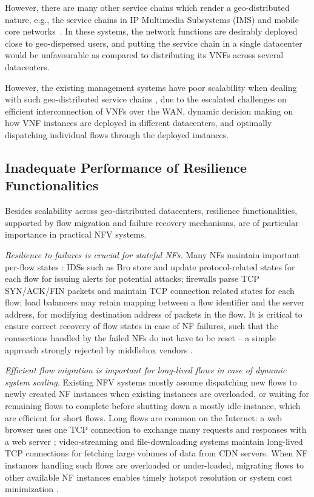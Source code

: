 However, there are many other service chains which render a geo-distributed nature, e.g., the service chains in IP Multimedia Subsystems (IMS) \cite{3gpp-ims} and mobile core networks~\cite{epc}. In these systems, the network functions are desirably deployed close to geo-dispersed users, and putting the service chain in a single datacenter would be unfavourable as compared to distributing its VNFs across several datacenters.

However, the existing management systems have poor scalability when dealing with such geo-distributed service chains \cite{qazi2016klein}, due to the escalated challenges on efficient interconnection of VNFs over the WAN, dynamic decision making on how VNF instances are deployed in different datacenters, and optimally dispatching individual flows through the deployed instances.

\subsection{Inadequate Performance of Resilience Functionalities}

Besides scalability across geo-distributed datacenters, resilience functionalities, supported by flow migration and failure recovery mechanisms, are of particular importance in practical NFV systems.

{\em Resilience to failures \cite{sherry2015rollback,rajagopalan2013pico} is crucial for stateful NFs.}  Many NFs maintain important per-flow states \cite{EnablingNF}: IDSs such as Bro \cite{bro} store and update protocol-related states for each flow for issuing alerts for potential attacks; firewalls \cite{firewall} parse TCP SYN/ACK/FIN packets and maintain TCP connection related states for each flow; load balancers \cite{lvs} may retain mapping between a flow identifier and the server address, for modifying destination address of packets in the flow. It is critical to ensure correct recovery of flow states in case of NF failures, such that the connections handled by the failed NFs do not have to be reset -- a simple approach strongly rejected by middlebox vendors \cite{sherry2015rollback}.

{\em Efficient flow migration \cite{rajagopalan2013split, gember2015opennf, qazi2017high} is important for long-lived flows in case of dynamic system scaling.} Existing NFV systems \cite{palkar2015e2, gember2012stratos} mostly assume dispatching new flows to newly created NF instances when existing instances are overloaded, or waiting for remaining flows to complete before shutting down a mostly idle instance, which are efficient for short flows. Long flows are common on the Internet:  a web browser uses one TCP connection to exchange many requests and responses with a web server \cite{http-keep-alive}; video-streaming \cite{ffmpeg} and file-downloading \cite{ftp} systems maintain long-lived TCP connections for fetching large volumes of data from CDN servers. When NF instances handling such flows are overloaded or under-loaded, migrating flows to other available NF instances enables timely hotspot resolution or system cost minimization \cite{gember2015opennf}.

